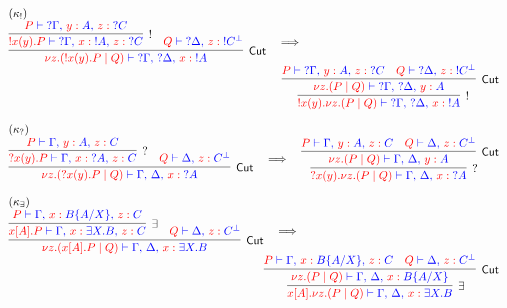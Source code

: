 \begin{figure*}
\[\colored
\begin{array}{c}

\multicolumn{1}{l}{(\kappa_{!})} \\
\vcenter{
  \inference{
    \inference{
      \tm{P} \tpvdash \tp{{?\Gamma} \comma \tmof{y}A \comma \tmof{z}{?C}}
    }{!}{
      \tm{!x(y).P} \tpvdash
        \tp{{?\Gamma} \comma \tmof{x}{!A} \comma \tmof{z}{?C}}
    }
    &
    \tm{Q} \tpvdash \tp{{?\Delta} \comma \tmof{z}{!C^\bot}}
  }{Cut}{
   \tm{\nu z \Of{?C}.(!x(y).P \mid Q)} \tpvdash
     \tp{{?\Gamma} \comma {?\Delta} \comma \tmof{x}{!A}}
  }
}
\quad \becomes \hfill \\
\hfill
\vcenter{
  \inference{
    \inference{
      \tm{P} \tpvdash \tp{{?\Gamma} \comma \tmof{y}A \comma \tmof{z}{?C}}
      &
      \tm{Q} \tpvdash \tp{{?\Delta} \comma \tmof{z}{!C^\bot}}
    }{Cut}{
     \tm{\nu z \Of{?C}. (P \mid Q)} \tpvdash
       \tp{{?\Gamma} \comma {?\Delta} \comma \tmof{y}A}
    }
  }{!}{
   \tm{!x(y).\nu z \Of{?C}. (P \mid Q)}
     \tpvdash \tp{{?\Gamma} \comma {?\Delta} \comma \tmof{x}{!A}}
  }
}

\\~\\
\multicolumn{1}{l}{(\kappa_{?})} \\
\vcenter{
  \inference{
    \inference{
      \tm{P} \tpvdash \tp{\Gamma \comma \tmof{y}A \comma \tmof{z}C}
    }{?}{
      \tm{?x(y).P} \tpvdash \tp{\Gamma \comma \tmof{x}{?A} \comma \tmof{z}C}
    }
    &
    \tm{Q} \tpvdash \tp{\Delta \comma \tmof{z}C^\bot}
  }{Cut}{
   \tm{\nu z \Of{C}.(?x(y).P \mid Q)} \tpvdash
     \tp{\Gamma \comma \Delta \comma \tmof{x}{?A}}
  }
}
\quad \becomes \quad
\vcenter{
  \inference{
    \inference{
      \tm{P} \tpvdash \tp{\Gamma \comma \tmof{y}A \comma \tmof{z}C}
      &
      \tm{Q} \tpvdash \tp{\Delta \comma \tmof{z}C^\bot}
    }{Cut}{
     \tm{\nu z \Of{C}. (P \mid Q)} \tpvdash
       \tp{\Gamma \comma \Delta \comma \tmof{y}A}
    }
  }{?}{
   \tm{?x(y).\nu z \Of{C}. (P \mid Q)}
     \tpvdash \tp{\Gamma \comma \Delta \comma \tmof{x}{?A}}
  }
}

\\~\\
\multicolumn{1}{l}{(\kappa_{\exists})} \\
\vcenter{
  \inference{
    \inference{
      \tm{P} \tpvdash \tp{\Gamma \comma \tmof{x}B\sub{A/X} \comma \tmof{z}C}
    }{\exists}{
      \tm{x[A].P} \tpvdash
        \tp{\Gamma \comma \tmof{x}\any{X}B \comma \tmof{z}C}
    }
    &
    \tm{Q} \tpvdash \tp{\Delta \comma \tmof{z}C^\bot}
  }{Cut}{
    \tm{\nu z \Of{C}.(x[A].P \mid Q)} \tpvdash
      \tp{\Gamma \comma \Delta \comma \tmof{x}\any{X}B}
  }
}
\quad \becomes \hfill \\
\hfill
\vcenter{
  \inference{
    \inference{
      \tm{P} \tpvdash \tp{\Gamma \comma \tmof{x}B\sub{A/X} \comma \tmof{z}C}
      &
      \tm{Q} \tpvdash \tp{\Delta \comma \tmof{z}C^\bot}
    }{Cut}{
      \tm{\nu z \Of{C}.(P \mid Q)} \tpvdash 
        \tp{\Gamma \comma \Delta \comma \tmof{x}B\sub{A/X}}
    }
  }{\exists}{
    \tm{x[A].\nu z \Of{C}.(P \mid Q)} \tpvdash
      \tp{\Gamma \comma \Delta \comma \tmof{x}\any{X}B}
  }
}


\end{array}\]
\end{figure*}

